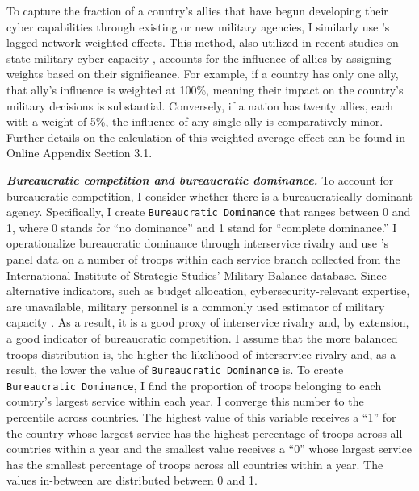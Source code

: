 \documentclass[12pt, letterpaper]{article}
\theoremstyle{plain}
\theoremstyle{remark}
\begin{document}
To capture the fraction of a country's allies that have begun developing their cyber capabilities through existing or new military agencies, I similarly use \citet{Simmons2004APSR}'s lagged network-weighted effects. This method, also utilized in recent studies on state military cyber capacity \citep{Kostyuk2024JPR}, accounts for the influence of allies by assigning weights based on their significance. For example, if a country has only one ally, that ally’s influence is weighted at 100\%, meaning their impact on the country's military decisions is substantial. Conversely, if a nation has twenty allies, each with a weight of 5\%, the influence of any single ally is comparatively minor. Further details on the calculation of this weighted average effect can be found in Online Appendix Section 3.1.
\vspace{3mm}


\noindent
\textbf{\textit{Bureaucratic competition and bureaucratic dominance.}}
To account for bureaucratic competition, I consider whether there is a bureaucratically-dominant agency. Specifically, I create \texttt{Bureaucratic Dominance} that ranges between 0 and 1, where 0 stands for ``no dominance'' and 1 stand for ``complete dominance.'' I operationalize bureaucratic dominance through interservice rivalry and use \citet{Gannon2024}'s panel data on a number of troops within each service branch collected from the International Institute of Strategic Studies' Military Balance database. Since alternative indicators, such as budget allocation, cybersecurity-relevant expertise, are unavailable, military personnel is a commonly used estimator of military capacity \citep{Walter2006AJPS}. As a result, it is a good proxy of interservice rivalry and, by extension, a good indicator of bureaucratic competition. 
I assume that the more balanced troops distribution is, the higher the likelihood of interservice rivalry and, as a result, the lower the value of \texttt{Bureaucratic Dominance} is. To create \texttt{Bureaucratic Dominance}, I find the proportion of troops belonging to each country's largest service within each year. 
I converge this number to the percentile across countries. 
The highest value of this variable receives a ``1'' for the country whose largest service has the highest percentage of troops across all countries within a year and the smallest value receives a ``0'' whose largest service has the smallest percentage of troops across all countries within a year. The values in-between are distributed between 0 and 1.
\end{document}
